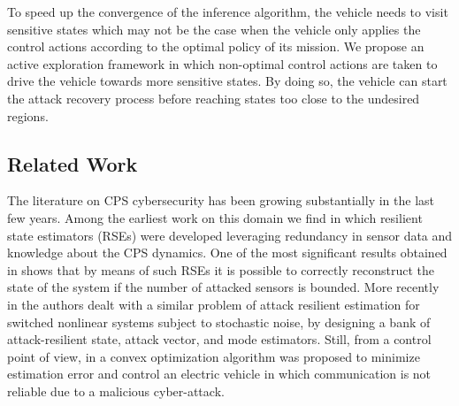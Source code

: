 \documentclass[letterpaper, 10 pt, conference]{ieeeconf}  %
\newcommand\NB[1]{$\spadesuit$\footnote{NB: #1}}
\begin{document}
To speed up the convergence of the inference algorithm, the vehicle needs to visit sensitive states which may not be the case when the vehicle only applies the control actions according to the optimal policy of its mission. We propose an active exploration framework in which non-optimal control actions are taken to drive the vehicle towards more sensitive states. By doing so, the vehicle can start the attack recovery process before reaching states too close to the undesired regions.%


\subsection{Related Work}\label{subsec:related}

The literature on CPS cybersecurity has been growing substantially in the last few years. 
Among the earliest work on this domain we find \cite{fawzi2014secure, ivanov2014attack, pajic2014robustness, bezzo2014attack} in which resilient state estimators (RSEs) were developed leveraging redundancy in sensor data and knowledge about the CPS dynamics. One of the most significant results obtained in \cite{fawzi2014secure, pajic2014robustness} shows that by means of such RSEs it is possible to correctly reconstruct the state of the system if the number of attacked sensors is bounded.
More recently in \cite{kim2017attack} the authors dealt with a similar problem of attack resilient estimation for switched nonlinear systems subject to stochastic noise, by designing a bank of attack-resilient state, attack vector, and mode estimators. Still, from a control point of view, in \cite{rana2017attack} a convex optimization algorithm was proposed to minimize estimation error and control an electric vehicle in which communication is not reliable due to a malicious cyber-attack.
\end{document}
